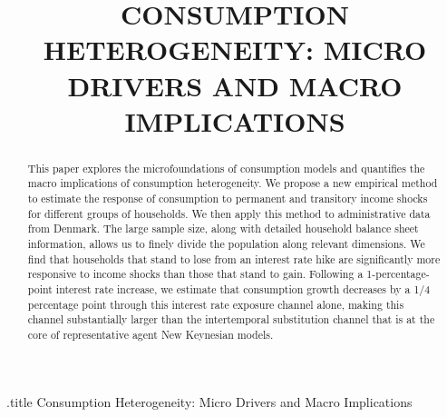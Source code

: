 \documentclass[titlepage]{\econtex}\newcommand{\texname}{ConsumptionHeterogeneity}
\begin{document}

	
	\begin{verbatimwrite}{\jobname.title}
		Consumption Heterogeneity: Micro Drivers and Macro Implications
	\end{verbatimwrite}
	
	
	\title{ 
		CONSUMPTION HETEROGENEITY: MICRO DRIVERS AND MACRO IMPLICATIONS}
	
	
	
	\maketitle
	
	
	\begin{abstract}
		This paper explores the microfoundations of consumption models and quantifies the macro implications of consumption heterogeneity. We propose a new empirical method to estimate the response of consumption to permanent and transitory income shocks for different groups of households. We then apply this method to administrative data from Denmark. The large sample size, along with detailed household balance sheet information, allows us to finely divide the population along relevant dimensions. We find that households that stand to lose from an interest rate hike are significantly more responsive to income shocks than those that stand to gain. Following a 1-percentage-point interest rate increase, we estimate that consumption growth decreases by a 1/4 percentage point through this interest rate exposure channel alone, making this channel substantially larger than the intertemporal substitution channel that is at the core of representative agent New Keynesian models.
	\end{abstract}
	
\end{document}

